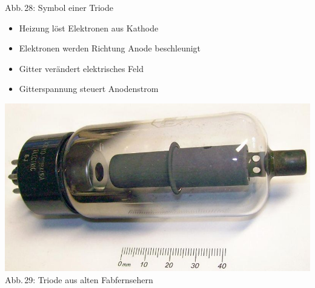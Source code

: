 \begin{frame}
\begin{minipage}{0.3\textwidth}
    {\tiny Abb.\,28: Symbol einer Triode~\cite{wp}}
  \end{minipage}
  \hspace{0.5cm}
  \begin{minipage}{0.5\textwidth}
    \begin{small}
      \begin{itemize}
	\item Heizung löst Elektronen aus Kathode
	\item Elektronen werden Richtung Anode beschleunigt
	\item Gitter verändert elektrisches Feld
	\item Gitterspannung steuert Anodenstrom
      \end{itemize}
    \end{small}
    \begin{center}
      \includegraphics[scale=0.4 ]{a06/Triode.jpg}\\
      {\tiny Abb.\,29: Triode aus alten Fabfernsehern~\cite{wp}}
    \end{center}
  \end{minipage}
\end{frame}


